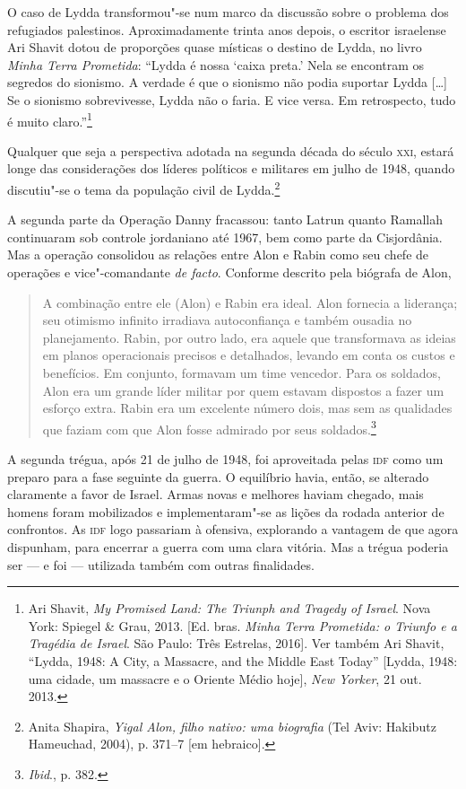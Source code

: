 O caso de Lydda transformou"-se num marco da discussão sobre o problema
dos refugiados palestinos. Aproximadamente trinta anos depois, o escritor
israelense Ari Shavit dotou de proporções quase místicas o destino de
	Lydda, no livro \emph{Minha Terra Prometida}: ``Lydda é nossa `caixa
	preta.' Nela se encontram os segredos do sionismo. A verdade é que o
	sionismo não podia suportar Lydda {[}\ldots{}{]} Se o sionismo sobrevivesse, Lydda
não o faria. E vice versa. Em retrospecto, tudo é muito
claro.''\footnote{Ari Shavit, \emph{My Promised Land: The Triunph and Tragedy of Israel}. Nova York: Spiegel \& Grau, 2013. {[}Ed. bras. \emph{Minha Terra Prometida: o Triunfo e a Tragédia de Israel}. São Paulo: Três Estrelas, 2016{]}. Ver também Ari Shavit, ``Lydda, 1948: A City,
a Massacre, and the Middle East Today'' [Lydda, 1948: uma cidade, um massacre e o Oriente Médio hoje],
\emph{New Yorker}, 21 out. 2013.}

Qualquer que seja a perspectiva adotada na segunda década do século \textsc{xxi},
estará longe das considerações dos líderes políticos e militares em
julho de 1948, quando discutiu"-se o tema da população civil de
Lydda.\footnote{Anita Shapira, \emph{Yigal Alon, filho nativo: uma biografia} (Tel Aviv:
Hakibutz Hameuchad, 2004), p. 371--7 {[}em hebraico{]}.}

A segunda parte da Operação Danny fracassou: tanto Latrun quanto
Ramallah continuaram sob controle jordaniano até 1967, bem como parte da Cisjordânia.
Mas a operação consolidou as relações entre Alon e Rabin como
seu chefe de operações e vice"-comandante \emph{de facto}. Conforme
descrito pela biógrafa de Alon, 

\begin{quote}
A combinação entre ele (Alon) e Rabin
era ideal. Alon fornecia a liderança; seu otimismo infinito irradiava 
autoconfiança e também ousadia no planejamento. Rabin,
por outro lado, era aquele que transformava as ideias em planos
operacionais precisos e detalhados, levando em conta os custos e
benefícios. Em conjunto, formavam um time vencedor. Para os soldados, Alon
era um grande líder militar por quem estavam dispostos a fazer um
esforço extra. Rabin era um excelente número dois, mas sem as qualidades
que faziam com que Alon fosse admirado por seus soldados.\footnote{\emph{Ibid}., p. 382.}
\end{quote}

A segunda trégua, após 21 de julho de 1948, foi aproveitada pelas \textsc{idf}
como um preparo para a fase seguinte da guerra. O equilíbrio havia,
então, se alterado claramente a favor de Israel. Armas novas e melhores
haviam chegado, mais homens foram mobilizados e 
implementaram"-se as lições da rodada anterior de confrontos. As \textsc{idf} logo
passariam à ofensiva, explorando a vantagem de que agora dispunham, para
encerrar a guerra com uma clara vitória. Mas a trégua poderia ser --- e foi ---
utilizada também com outras finalidades.


